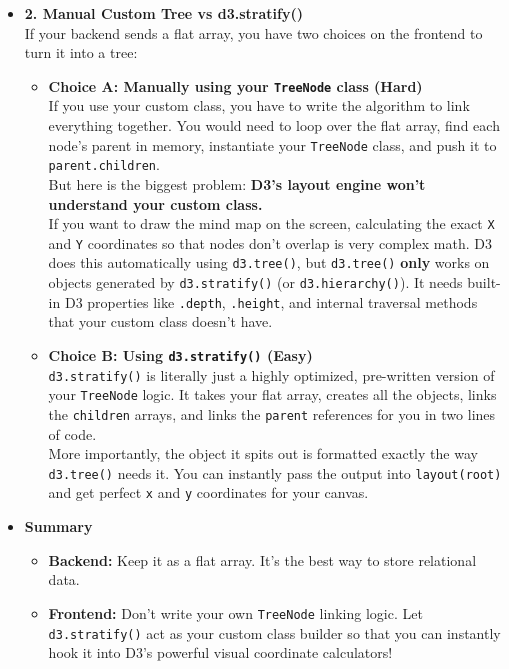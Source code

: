 \documentclass[12pt, a4paper]{article}
\begin{document}
\begin{tcolorbox}[colback=blue!5!white,colframe=blue!75!black,title=Architecture FAQ: Custom Class vs d3.stratify]
\begin{itemize}
    \item \textbf{2. Manual Custom Tree vs d3.stratify()} \\
    If your backend sends a flat array, you have two choices on the frontend to turn it into a tree:
    \begin{itemize}
        \item \textbf{Choice A: Manually using your \texttt{TreeNode} class (Hard)} \\
        If you use your custom class, you have to write the algorithm to link everything together. You would need to loop over the flat array, find each node's parent in memory, instantiate your \texttt{TreeNode} class, and push it to \texttt{parent.children}. \\
        But here is the biggest problem: \textbf{D3's layout engine won't understand your custom class.} \\
        If you want to draw the mind map on the screen, calculating the exact \texttt{X} and \texttt{Y} coordinates so that nodes don't overlap is very complex math. D3 does this automatically using \texttt{d3.tree()}, but \texttt{d3.tree()} \textbf{only} works on objects generated by \texttt{d3.stratify()} (or \texttt{d3.hierarchy()}). It needs built-in D3 properties like \texttt{.depth}, \texttt{.height}, and internal traversal methods that your custom class doesn't have.

        \item \textbf{Choice B: Using \texttt{d3.stratify()} (Easy)} \\
        \texttt{d3.stratify()} is literally just a highly optimized, pre-written version of your \texttt{TreeNode} logic. It takes your flat array, creates all the objects, links the \texttt{children} arrays, and links the \texttt{parent} references for you in two lines of code. \\
        More importantly, the object it spits out is formatted exactly the way \texttt{d3.tree()} needs it. You can instantly pass the output into \texttt{layout(root)} and get perfect \texttt{x} and \texttt{y} coordinates for your canvas.
    \end{itemize}

    \item \textbf{Summary}
    \begin{itemize}
        \item \textbf{Backend:} Keep it as a flat array. It's the best way to store relational data.
        \item \textbf{Frontend:} Don't write your own \texttt{TreeNode} linking logic. Let \texttt{d3.stratify()} act as your custom class builder so that you can instantly hook it into D3's powerful visual coordinate calculators!
    \end{itemize}
\end{itemize}
\end{tcolorbox}
\vspace{1em}
\end{document}
